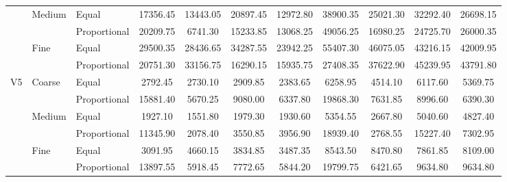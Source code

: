 \documentclass[10pt,journal,cspaper,compsoc,onecolumn]{IEEEtran}
\begin{document}
\begin{table}
\begin{tabular}{|c|l|l|c|c|c|c|c|c|c|c|}
	& Medium	& Equal	& 17356.45	& 13443.05	& 20897.45	& 12972.80	& 38900.35	& 25021.30	& 32292.40	& 26698.15	 \\ \cline{3-11}
	& 	& Proportional	& 20209.75	& 6741.30	& 15233.85	& 13068.25	& 49056.25	& 16980.25	& 24725.70	& 26000.35	 \\ \cline{2-11}
	& Fine	& Equal	& 29500.35	& 28436.65	& 34287.55	& 23942.25	& 55407.30	& 46075.05	& 43216.15	& 42009.95	 \\ \cline{3-11}
	& 	& Proportional	& 20751.30	& 33156.75	& 16290.15	& 15935.75	& 27408.35	& 37622.90	& 45239.95	& 43791.80	 \\ \hline
V5	& Coarse	& Equal	& 2792.45	& 2730.10	& 2909.85	& 2383.65	& 6258.95	& 4514.10	& 6117.60	& 5369.75	 \\ \cline{3-11}
	& 	& Proportional	& 15881.40	& 5670.25	& 9080.00	& 6337.80	& 19868.30	& 7631.85	& 8996.60	& 6390.30	 \\ \cline{2-11}
	& Medium	& Equal	& 1927.10	& 1551.80	& 1979.30	& 1930.60	& 5354.55	& 2667.80	& 5040.60	& 4827.40	 \\ \cline{3-11}
	& 	& Proportional	& 11345.90	& 2078.40	& 3550.85	& 3956.90	& 18939.40	& 2768.55	& 15227.40	& 7302.95	 \\ \cline{2-11}
	& Fine	& Equal	& 3091.95	& 4660.15	& 3834.85	& 3487.35	& 8543.50	& 8470.80	& 7861.85	& 8109.00	 \\ \cline{3-11}
	& 	& Proportional	& 13897.55	& 5918.45	& 7772.65	& 5844.20	& 19799.75	& 6421.65	& 9634.80	& 9634.80	 \\ \hline
\end{tabular}
\end{table}
\end{document}
